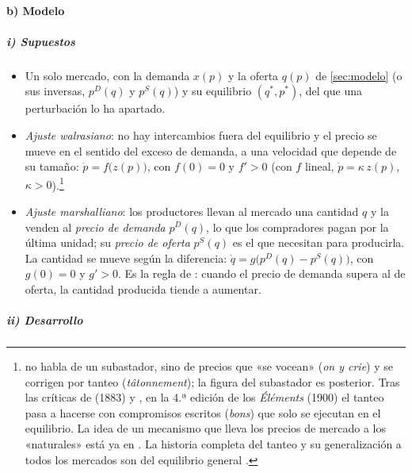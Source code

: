 \documentclass[11pt]{article}
\begin{document}
\paragraph{b) Modelo}

\subparagraph{i) Supuestos}

\begin{itemize}
\item Un solo mercado, con la demanda $x(p)$ y la oferta $q(p)$ de \ref{sec:modelo} (o sus inversas, $p^D(q)$ y $p^S(q)$) y su equilibrio $(q^*,p^*)$, del que una perturbación lo ha apartado.
\item \emph{Ajuste walrasiano}: no hay intercambios fuera del equilibrio y el precio se mueve en el sentido del exceso de demanda, a una velocidad que depende de su tamaño: $\dot p=f\big(z(p)\big)$, con $f(0)=0$ y $f'>0$ (con $f$ lineal, $\dot p=\kappa\,z(p)$, $\kappa>0$).\footnote{ no habla de un subastador, sino de precios que «se vocean» (\emph{on y crie}) y se corrigen por tanteo (\emph{tâtonnement})\nocite{Walras1874Elements}; la figura del subastador es posterior. Tras las críticas de  (1883) y , en la 4.ª edición de los \emph{Éléments} (1900) el tanteo pasa a hacerse con compromisos escritos (\emph{bons}) que solo se ejecutan en el equilibrio\nocite{Walker1987Tatonnement}. La idea de un mecanismo que lleva los precios de mercado a los «naturales» está ya en \textcite[libro~I, cap.~VII]{Smith1776Wealth}. La historia completa del tanteo y su generalización a todos los mercados son del equilibrio general .}
\item \emph{Ajuste marshalliano}: los productores llevan al mercado una cantidad $q$ y la venden al \emph{precio de demanda} $p^D(q)$, lo que los compradores pagan por la última unidad; su \emph{precio de oferta} $p^S(q)$ es el que necesitan para producirla. La cantidad se mueve según la diferencia: $\dot q=g\big(p^D(q)-p^S(q)\big)$, con $g(0)=0$ y $g'>0$. Es la regla de \textcite[libro~V, cap.~III, §~6]{Marshall1890Principles}: cuando el precio de demanda supera al de oferta, la cantidad producida tiende a aumentar.
\end{itemize}

\subparagraph{ii) Desarrollo}
\end{document}
